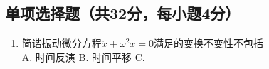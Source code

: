 
\subsection{单项选择题（共32分，每小题4分）}
\begin{enumerate}
\item 简谐振动微分方程$\ddot{x}+{\omega}^2{x}=0$满足的变换不变性不包括\\
A. 时间反演
B. 时间平移
C. 
\end{enumerate}